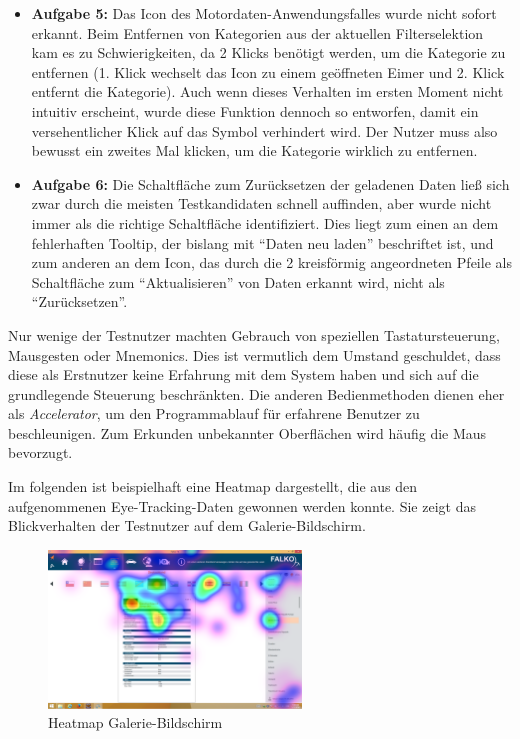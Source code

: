 \begin{itemize}
\item \textbf{Aufgabe 5:} Das Icon des Motordaten-Anwendungsfalles wurde nicht sofort erkannt. Beim Entfernen von Kategorien aus der aktuellen Filterselektion kam es zu Schwierigkeiten, da 2 Klicks benötigt werden, um die Kategorie zu entfernen (1. Klick wechselt das Icon zu einem geöffneten Eimer und 2. Klick entfernt die Kategorie). Auch wenn dieses Verhalten im ersten Moment nicht intuitiv erscheint, wurde diese Funktion dennoch so entworfen, damit ein versehentlicher Klick auf das Symbol verhindert wird. Der Nutzer muss also bewusst ein zweites Mal klicken, um die Kategorie wirklich zu entfernen.
\item \textbf{Aufgabe 6:} Die Schaltfläche zum Zurücksetzen der geladenen Daten ließ sich zwar durch die meisten Testkandidaten schnell auffinden, aber wurde nicht immer als die richtige Schaltfläche identifiziert. Dies liegt zum einen an dem fehlerhaften Tooltip, der bislang mit \enquote{Daten neu laden} beschriftet ist, und zum anderen an dem Icon, das durch die 2 kreisförmig angeordneten Pfeile als Schaltfläche zum \enquote{Aktualisieren} von Daten erkannt wird, nicht als \enquote{Zurücksetzen}.
\end{itemize}
Nur wenige der Testnutzer machten Gebrauch von speziellen Tastatursteuerung, Mausgesten oder Mnemonics. Dies ist vermutlich dem Umstand geschuldet, dass diese als Erstnutzer keine Erfahrung mit dem System haben und sich auf die grundlegende Steuerung beschränkten. Die anderen Bedienmethoden dienen eher als \textit{Accelerator}, um den Programmablauf für erfahrene Benutzer zu beschleunigen. Zum Erkunden unbekannter Oberflächen wird häufig die Maus bevorzugt.\par
Im folgenden ist beispielhaft eine Heatmap dargestellt, die aus den aufgenommenen Eye-Tracking-Daten gewonnen werden konnte. Sie zeigt das Blickverhalten der Testnutzer auf dem Galerie-Bildschirm.\par
\begin{figure}[H]
 \centering
 \includegraphics[width=0.6\textwidth]{grafiken/gallery_heatmap.png}
 \caption{Heatmap Galerie-Bildschirm}
 \label{fig:galleryHeatmap}
\end{figure}
